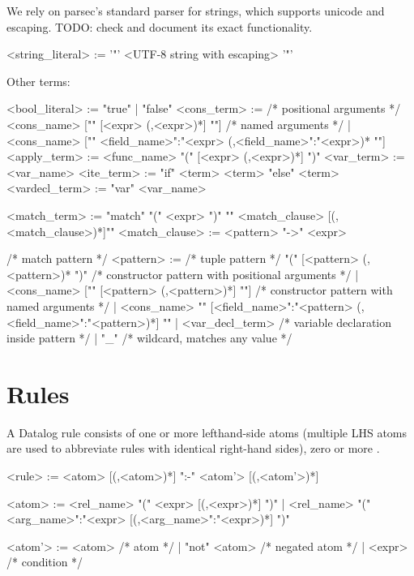 \documentclass{report}
\begin{document}
{\color{red}We rely on parsec's standard parser for strings, which
supports unicode and escaping. TODO: check and document its exact
functionality.}

\begin{bnflisting}{}
<string_literal>   := '"' <UTF-8 string with escaping> '"' 
\end{bnflisting}

Other terms:

\begin{bnflisting}{}
<bool_literal> := "true" | "false"
<cons_term>    := /* positional arguments */
                  <cons_name> ["{" [<expr> (,<expr>)*] "}"]
                  /* named arguments */
                | <cons_name> ["{" <field_name>":"<expr> (,<field_name>":"<expr>)* "}"]
<apply_term>   := <func_name> "(" [<expr> (,<expr>)*] ")"
<var_term>     := <var_name>
<ite_term>     := "if" <term> <term> "else" <term>
<vardecl_term> := "var" <var_name>

<match_term>   := "match" "(" <expr> ")" "{" <match_clause> [(,<match_clause>)*]"}"
<match_clause> := <pattern> "->" <expr>
\end{bnflisting}

\begin{bnflisting}{}
/* match pattern */
<pattern> := /* tuple pattern */
             "(" [<pattern> (,<pattern>)* ")"                      
             /* constructor pattern with positional arguments */
           | <cons_name> ["{" [<pattern> (,<pattern>)*] "}"]   
             /* constructor pattern with named arguments */
           | <cons_name> "{" [<field_name>":"<pattern> 
                             (,<field_name>":"<pattern>)*] "}"
           | <var_decl_term> /* variable declaration inside pattern */
           | "_"             /* wildcard, matches any value */
\end{bnflisting}

\section{Rules}

A Datalog rule consists of one or more lefthand-side atoms (multiple 
LHS atoms are used to abbreviate rules with identical right-hand 
sides), zero or more . 

\begin{bnflisting}{}
<rule> := <atom> [(,<atom>)*] ":-" <atom'> [(,<atom'>)*]

<atom> := <rel_name> "(" <expr> [(,<expr>)*] ")"
        | <rel_name> "(" <arg_name>":"<expr> [(,<arg_name>":"<expr>)*] ")"

<atom'> := <atom>        /* atom */
         | "not" <atom>  /* negated atom */
         | <expr>        /* condition */

\end{bnflisting}
\end{document}
